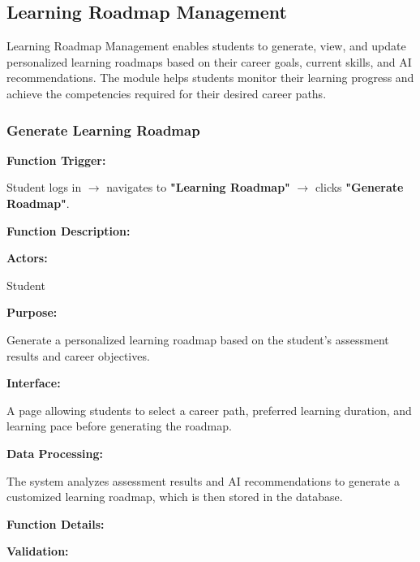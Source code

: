 \subsection{Learning Roadmap Management}

Learning Roadmap Management enables students to generate, view, and update personalized learning roadmaps based on their career goals, current skills, and AI recommendations. The module helps students monitor their learning progress and achieve the competencies required for their desired career paths.
\subsubsection{Generate Learning Roadmap}

\textbf{Function Trigger:}

Student logs in $\rightarrow$ navigates to \textbf{"Learning Roadmap"} $\rightarrow$ clicks \textbf{"Generate Roadmap"}.

\vspace{0.3cm}

\textbf{Function Description:}

\textbf{Actors:}

Student

\vspace{0.2cm}

\textbf{Purpose:}

Generate a personalized learning roadmap based on the student's assessment results and career objectives.

\vspace{0.2cm}

\textbf{Interface:}

A page allowing students to select a career path, preferred learning duration, and learning pace before generating the roadmap.

\vspace{0.2cm}

\textbf{Data Processing:}

The system analyzes assessment results and AI recommendations to generate a customized learning roadmap, which is then stored in the database.

\vspace{0.3cm}

\textbf{Function Details:}

\textbf{Validation:}

